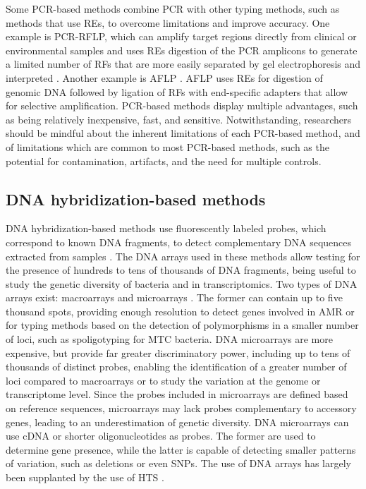 Some \ac{PCR}-based methods combine \ac{PCR} with other typing methods, such as methods that use \ac{REs}, to overcome limitations and improve accuracy. One example is \ac{PCR}-\ac{RFLP}, which can amplify target regions directly from clinical or environmental samples and uses \ac{REs} digestion of the \ac{PCR} amplicons to generate a limited number of \ac{RFs} that are more easily separated by gel electrophoresis and interpreted \cite{wichelhaus_rapid_2001}. Another example is \ac{AFLP} \cite{vos_aflp_1995}. \ac{AFLP} uses \ac{REs} for digestion of genomic \ac{DNA} followed by ligation of \ac{RFs} with end-specific adapters that allow for selective amplification.
\ac{PCR}-based methods display multiple advantages, such as being relatively inexpensive, fast, and sensitive. Notwithstanding, researchers should be mindful about the inherent limitations of each \ac{PCR}-based method, and of limitations which are common to most \ac{PCR}-based methods, such as the potential for contamination, artifacts, and the need for multiple controls.

\subsection{DNA hybridization-based methods}

\ac{DNA} hybridization-based methods use fluorescently labeled probes, which correspond to known \ac{DNA} fragments, to detect complementary \ac{DNA} sequences extracted from samples \cite{freeman_fundamentals_2000}. The \ac{DNA} arrays used in these methods allow testing for the presence of hundreds to tens of thousands of \ac{DNA} fragments, being useful to study the genetic diversity of bacteria and in transcriptomics. Two types of \ac{DNA} arrays exist: macroarrays \cite{gress_hybridization_1992, lennon_hybridization_1991} and microarrays \cite{derisi_use_1996, schena_quantitative_1995, shalon_dna_1996}. The former can contain up to five thousand spots, providing enough resolution to detect genes involved in \ac{AMR} or for typing methods based on the detection of polymorphisms in a smaller number of loci, such as spoligotyping for MTC bacteria. \ac{DNA} microarrays are more expensive, but provide far greater discriminatory power, including up to tens of thousands of distinct probes, enabling the identification of a greater number of loci compared to macroarrays or to study the variation at the genome or transcriptome level. Since the probes included in microarrays are defined based on reference sequences, microarrays may lack probes complementary to accessory genes, leading to an underestimation of genetic diversity. \ac{DNA} microarrays can use \ac{cDNA} or shorter oligonucleotides as probes. The former are used to determine gene presence, while the latter is capable of detecting smaller patterns of variation, such as deletions or even SNPs. The use of \ac{DNA} arrays has largely been supplanted by the use of \ac{HTS} \cite{bumgarner_dna_2013}.

